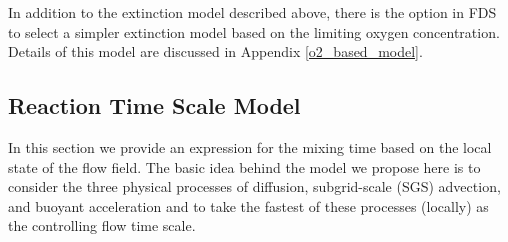 %
%
%

In addition to the extinction model described above, there is the option in FDS to select a simpler extinction model based on the limiting oxygen concentration. Details of this model are discussed in Appendix \ref{o2_based_model}.


\subsection{Reaction Time Scale Model}
\label{sec:reac_time_scale}

In this section we provide an expression for the mixing time based on the local state of the flow field.  The basic idea behind the model we propose here is to consider the three physical processes of diffusion, subgrid-scale (SGS) advection, and buoyant acceleration and to take the fastest of these processes (locally) as the controlling flow time scale.

